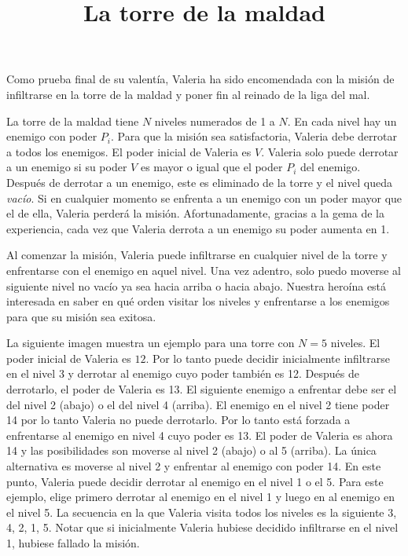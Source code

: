 \documentclass{oci}
\title{La torre de la maldad}
\begin{document}
\begin{problemDescription}
  Como prueba final de su valentía, Valeria ha sido encomendada con la misión de infiltrarse en la
  torre de la maldad y poner fin al reinado de la liga del mal.

  La torre de la maldad tiene $N$ niveles numerados de 1 a $N$.
  En cada nivel hay un enemigo con poder $P_i$.
  Para que la misión sea satisfactoria, Valeria debe derrotar a todos los enemigos.
  El poder inicial de Valeria es $V$.
  Valeria solo puede derrotar a un enemigo si su poder $V$ es mayor o igual que el poder $P_i$
  del enemigo.
  Después de derrotar a un enemigo, este es eliminado de la torre y el nivel queda \emph{vacío}.
  Si en cualquier momento se enfrenta a un enemigo con un poder mayor que el de ella, Valeria perderá
  la misión.
  Afortunadamente, gracias a la gema de la experiencia, cada vez que Valeria derrota a un enemigo
  su poder aumenta en 1.

  Al comenzar la misión, Valeria puede infiltrarse en cualquier nivel de la torre y
  enfrentarse con el enemigo en aquel nivel.
  Una vez adentro, solo puedo moverse al siguiente nivel no vacío ya sea hacia arriba o hacia abajo.
  Nuestra heroína está interesada en saber en qué orden visitar los niveles y enfrentarse a los enemigos
  para que su misión sea exitosa.

  La siguiente imagen muestra un ejemplo para una torre con $N=5$ niveles.
  El poder inicial de Valeria es $12$.
  Por lo tanto puede decidir inicialmente infiltrarse en el nivel 3 y derrotar al enemigo cuyo poder también es 12.
  Después de derrotarlo, el poder de Valeria es 13.
  El siguiente enemigo a enfrentar debe ser el del nivel 2 (abajo) o el del nivel 4 (arriba).
  El enemigo en el nivel 2 tiene poder 14 por lo tanto Valeria no puede derrotarlo.
  Por lo tanto está forzada a enfrentarse al enemigo en nivel 4 cuyo poder es 13.
  El poder de Valeria es ahora 14 y las posibilidades son moverse al nivel 2 (abajo) o al 5 (arriba).
  La única alternativa es moverse al nivel 2 y enfrentar al enemigo con poder 14.
  En este punto, Valeria puede decidir derrotar al enemigo en el nivel 1 o el 5.
  Para este ejemplo, elige primero derrotar al enemigo en el nivel 1 y luego en al enemigo en el nivel 5.
  La secuencia en la que Valeria visita todos los niveles es la siguiente 3, 4, 2, 1, 5.
  Notar que si inicialmente Valeria hubiese decidido infiltrarse en el nivel 1, hubiese
  fallado la misión.

  \begin{center}
\end{center}
\end{problemDescription}
\end{document}
